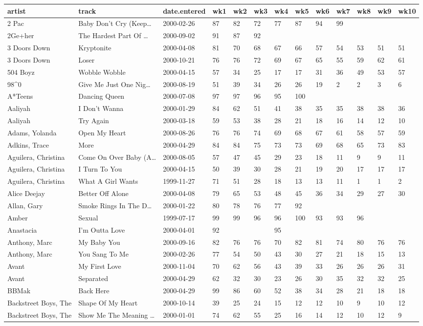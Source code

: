 \documentclass[]{article}
\begin{document}
\begin{longtable}[]{@{}lllllllllllll@{}}
\toprule
artist & track & date.entered & wk1 & wk2 & wk3 & wk4 & wk5 & wk6 & wk7
& wk8 & wk9 & wk10\tabularnewline
\midrule
\endhead
2 Pac & Baby Don't Cry (Keep\ldots{} & 2000-02-26 & 87 & 82 & 72 & 77 &
87 & 94 & 99 & & &\tabularnewline
2Ge+her & The Hardest Part Of \ldots{} & 2000-09-02 & 91 & 87 & 92 & & &
& & & &\tabularnewline
3 Doors Down & Kryptonite & 2000-04-08 & 81 & 70 & 68 & 67 & 66 & 57 &
54 & 53 & 51 & 51\tabularnewline
3 Doors Down & Loser & 2000-10-21 & 76 & 76 & 72 & 69 & 67 & 65 & 55 &
59 & 62 & 61\tabularnewline
504 Boyz & Wobble Wobble & 2000-04-15 & 57 & 34 & 25 & 17 & 17 & 31 & 36
& 49 & 53 & 57\tabularnewline
98\^{}0 & Give Me Just One Nig\ldots{} & 2000-08-19 & 51 & 39 & 34 & 26
& 26 & 19 & 2 & 2 & 3 & 6\tabularnewline
A*Teens & Dancing Queen & 2000-07-08 & 97 & 97 & 96 & 95 & 100 & & & &
&\tabularnewline
Aaliyah & I Don't Wanna & 2000-01-29 & 84 & 62 & 51 & 41 & 38 & 35 & 35
& 38 & 38 & 36\tabularnewline
Aaliyah & Try Again & 2000-03-18 & 59 & 53 & 38 & 28 & 21 & 18 & 16 & 14
& 12 & 10\tabularnewline
Adams, Yolanda & Open My Heart & 2000-08-26 & 76 & 76 & 74 & 69 & 68 &
67 & 61 & 58 & 57 & 59\tabularnewline
Adkins, Trace & More & 2000-04-29 & 84 & 84 & 75 & 73 & 73 & 69 & 68 &
65 & 73 & 83\tabularnewline
Aguilera, Christina & Come On Over Baby (A\ldots{} & 2000-08-05 & 57 &
47 & 45 & 29 & 23 & 18 & 11 & 9 & 9 & 11\tabularnewline
Aguilera, Christina & I Turn To You & 2000-04-15 & 50 & 39 & 30 & 28 &
21 & 19 & 20 & 17 & 17 & 17\tabularnewline
Aguilera, Christina & What A Girl Wants & 1999-11-27 & 71 & 51 & 28 & 18
& 13 & 13 & 11 & 1 & 1 & 2\tabularnewline
Alice Deejay & Better Off Alone & 2000-04-08 & 79 & 65 & 53 & 48 & 45 &
36 & 34 & 29 & 27 & 30\tabularnewline
Allan, Gary & Smoke Rings In The D\ldots{} & 2000-01-22 & 80 & 78 & 76 &
77 & 92 & & & & &\tabularnewline
Amber & Sexual & 1999-07-17 & 99 & 99 & 96 & 96 & 100 & 93 & 93 & 96 &
&\tabularnewline
Anastacia & I'm Outta Love & 2000-04-01 & 92 & & & 95 & & & & &
&\tabularnewline
Anthony, Marc & My Baby You & 2000-09-16 & 82 & 76 & 76 & 70 & 82 & 81 &
74 & 80 & 76 & 76\tabularnewline
Anthony, Marc & You Sang To Me & 2000-02-26 & 77 & 54 & 50 & 43 & 30 &
27 & 21 & 18 & 15 & 13\tabularnewline
Avant & My First Love & 2000-11-04 & 70 & 62 & 56 & 43 & 39 & 33 & 26 &
26 & 26 & 31\tabularnewline
Avant & Separated & 2000-04-29 & 62 & 32 & 30 & 23 & 26 & 30 & 35 & 32 &
32 & 25\tabularnewline
BBMak & Back Here & 2000-04-29 & 99 & 86 & 60 & 52 & 38 & 34 & 28 & 21 &
18 & 18\tabularnewline
Backstreet Boys, The & Shape Of My Heart & 2000-10-14 & 39 & 25 & 24 &
15 & 12 & 12 & 10 & 9 & 10 & 12\tabularnewline
Backstreet Boys, The & Show Me The Meaning \ldots{} & 2000-01-01 & 74 &
62 & 55 & 25 & 16 & 14 & 12 & 10 & 12 & 9\tabularnewline
\bottomrule
\end{longtable}
\end{document}
